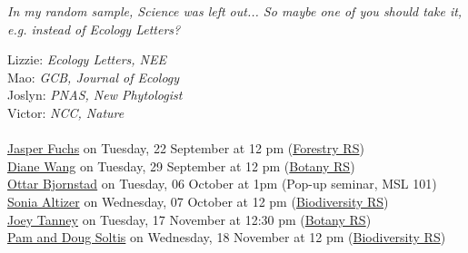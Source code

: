 \documentclass[11pt]{article}
\begin{document}

{\scriptsize\emph{In my random sample, Science was left out... So maybe one of you should take it, e.g. instead of Ecology Letters?}}

Lizzie: \emph{Ecology Letters, NEE}\\
Mao: \emph{GCB, Journal of Ecology}\\
Joslyn: \emph{PNAS, New Phytologist}\\
Victor: \emph{NCC, Nature}\\

\vspace{6pt}
 \\

\href{https://usys.ethz.ch/en/people/profile.jasper-m-fuchs.html}{Jasper Fuchs} on Tuesday, 22 September at 12 pm (\href{https://forestry.ubc.ca/events/tree-species-diversification/}{Forestry RS})\\

\href{https://www.dianewanglab.com/}{Diane Wang} on Tuesday, 29 September at 12 pm (\href{https://botany.ubc.ca/events/event/guest-speaker-diane-wang/}{Botany RS})\\

\href{https://ento.psu.edu/directory/onb1}{Ottar Bjornstad} on Tuesday, 06 October at 1pm (Pop-up seminar, MSL 101)\\

\href{https://www.altizerlab.org/}{Sonia Altizer} on Wednesday, 07 October at 12 pm (\href{https://biodiversity.ubc.ca/events/brs-sonia-altizer-migrating-monarchs-and-disease-dynamics-warming-world}{Biodiversity RS})\\

\href{https://coadaptree.forestry.ubc.ca/people/joey-tanney-post-doc/}{Joey Tanney} on Tuesday, 17 November at 12:30 pm (\href{https://botany.ubc.ca/events/event/guest-speaker-joey-tanney/}{Botany RS})\\

\href{https://www.floridamuseum.ufl.edu/soltis-lab/}{Pam and Doug Soltis} on Wednesday, 18 November at 12 pm (\href{https://biodiversity.ubc.ca/events/brs-pamela-and-doug-soltis-polyploidy-across-tissues-organisms-and-ecosystems}{Biodiversity RS})\\
\end{document}
